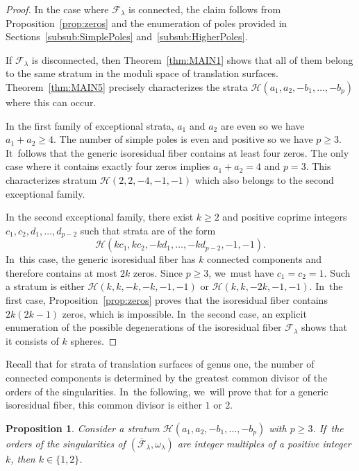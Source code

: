 \documentclass[11pt]{article}
\newtheorem{prop}[thm]{Proposition}
\theoremstyle{definition}
\begin{document}
\begin{proof}
In the case where $\mathcal{F}_{\lambda}$ is connected, the claim follows from Proposition~\ref{prop:zeros} and the enumeration of poles provided in Sections~\ref{subsub:SimplePoles} and~\ref{subsub:HigherPoles}.

If $\mathcal{F}_{\lambda}$ is disconnected, then Theorem~\ref{thm:MAIN1} shows that all of them belong to the same stratum in the moduli space of translation surfaces. Theorem~\ref{thm:MAIN5} precisely characterizes the strata $\mathcal{H}(a_{1},a_{2},-b_{1},\dots,-b_{p})$ where this can occur.

In the first family of exceptional strata, $a_{1}$ and $a_{2}$ are even so we have \hbox{$a_{1}\!+\!a_{2}\!\geq\! 4$}. The number of simple poles is even and positive so we have $p \geq 3$. It~follows that the generic isoresidual fiber contains at least four zeros. The only case where it contains exactly four zeros implies $a_{1}+a_{2}=4$ and $p=3$. This characterizes stratum $\mathcal{H}(2,2,-4,-1,-1)$ which also belongs to the second exceptional family.

In the second exceptional family, there exist $k \geq 2$ and positive coprime integers $c_{1},c_{2},d_{1},\dots,d_{p-2}$ such that strata are of the form
\[
\mathcal{H}(kc_{1},kc_{2},-kd_{1},\dots,-kd_{p-2},-1,-1).
\]
In~this case, the generic isoresidual fiber has $k$ connected components and therefore contains at most $2k$ zeros. Since $p \geq 3$, we~must have $c_{1}=c_{2}=1$. Such a stratum is either $\mathcal{H}(k,k,-k,-k,-1,-1)$ or $\mathcal{H}(k,k,-2k,-1,-1)$. In~the first case, Proposition~\ref{prop:zeros} proves that the isoresidual fiber contains $2k(2k-1)$ zeros, which is impossible. In~the second case, an explicit enumeration of the possible degenerations of the isoresidual fiber $\mathcal F_\lambda$ shows that it consists of $k$ spheres.
\end{proof}

Recall that for strata of translation surfaces of genus one, the number of connected components is determined by the greatest common divisor of the orders of the singularities. In~the following, we~will prove that for a generic isoresidual fiber, this common divisor is either $1$ or $2$.

\begin{prop}\label{prop:Factor}
Consider a stratum $\mathcal{H}(a_{1},a_{2},-b_{1},\dots,-b_{p})$ with $p \geq 3$. If~the orders of the singularities of $(\overline{\mathcal{F}}_{\lambda},\omega_{\lambda})$ are integer multiples of a positive integer $k$, then $k \in \lbrace{ 1,2 \rbrace}$.
\end{prop}
\end{document}
